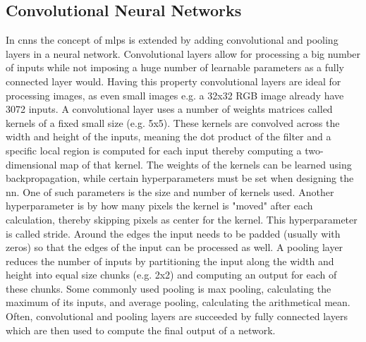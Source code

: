 \subsection{Convolutional Neural Networks}
In \ac{cnn}s the concept of \ac{mlp}s is extended by adding convolutional and pooling layers in a neural network. Convolutional layers allow for processing a big number of inputs while not imposing a huge number of learnable parameters as a fully connected layer would. Having this property convolutional layers are ideal for processing images, as even small images e.g. a 32x32 RGB image already have 3072 inputs.
A convolutional layer uses a number of weights matrices called kernels of a fixed small size (e.g. 5x5). These kernels are convolved across the width and height of the inputs, meaning the dot product of the filter and a specific local region is computed for each input thereby computing a two-dimensional map of that kernel. The weights of the kernels can be learned using backpropagation, while certain hyperparameters must be set when designing the \ac{nn}. One of such parameters is the size and number of kernels used. Another hyperparameter is by how many pixels the kernel is "moved" after each calculation, thereby skipping pixels as center for the kernel. This hyperparameter is called stride. Around the edges the input needs to be padded (usually with zeros) so that the edges of the input can be processed as well.
A pooling layer reduces the number of inputs by partitioning the input along the width and height into equal size chunks (e.g. 2x2) and computing an output for each of these chunks. Some commonly used pooling is max pooling, calculating the maximum of its inputs, and average pooling, calculating the arithmetical mean.
Often, convolutional and pooling layers are succeeded by fully connected layers which are then used to compute the final output of a network.




%

